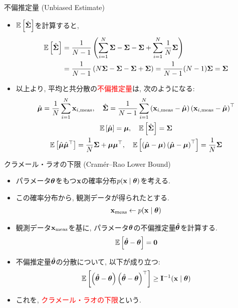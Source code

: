 \documentclass[dvipdfmx,notheorems,t]{beamer}
\begin{document}
\begin{frame}{不偏推定量 (Unbiased Estimate)}
\begin{itemize}
  \item $\operatorname{\mathbb{E}} \left[ \hat{\vb*{\Sigma}} \right]$を計算すると,
  \begin{align*}
    \operatorname{\mathbb{E}} \left[ \hat{\vb*{\Sigma}} \right] &= \frac{1}{N - 1} \left(
      \sum_{i = 1}^N \vb{\Sigma} - \vb{\Sigma} - \vb{\Sigma} + \sum_{i = 1}^N \frac{1}{N} \vb{\Sigma} \right) \\
    &= \frac{1}{N - 1} \left( N \vb{\Sigma} - \vb{\Sigma} - \vb{\Sigma} + \vb{\Sigma} \right)
    = \frac{1}{N - 1} (N - 1) \vb{\Sigma} = \vb{\Sigma}
  \end{align*}
  \item 以上より, 平均と共分散の\textcolor{red}{不偏推定量}は, 次のようになる:
  \begin{gather*}
    \hat{\vb*{\mu}} = \frac{1}{N} \sum_{i = 1}^N \vb{x}_{i, \mathrm{meas}}, \quad
    \hat{\vb{\Sigma}} = \frac{1}{N - 1} \sum_{i = 1}^N
      \left( \vb{x}_{i, \mathrm{meas}} - \hat{\vb*{\mu}} \right)
      \left( \vb{x}_{i, \mathrm{meas}} - \hat{\vb*{\mu}} \right)^\top \\
    \operatorname{\mathbb{E}} \left[ \hat{\vb*{\mu}} \right] = \vb*{\mu}, \quad
    \operatorname{\mathbb{E}} \left[ \hat{\vb{\Sigma}} \right] = \vb{\Sigma} \\
    \operatorname{\mathbb{E}} \left[ \hat{\vb*{\mu}} \hat{\vb*{\mu}}^\top \right] = \frac{1}{N} \vb{\Sigma} + \vb*{\mu} \vb*{\mu}^\top, \quad
    \operatorname{\mathbb{E}} \left[ \left( \hat{\vb*{\mu}} - \vb*{\mu} \right)
      \left( \hat{\vb*{\mu}} - \vb*{\mu} \right)^\top \right] = \frac{1}{N} \vb{\Sigma}
  \end{gather*}
\end{itemize}
\end{frame}

\begin{frame}{クラメール・ラオの下限 (Cramér--Rao Lower Bound)}
\begin{itemize}
  \item パラメータ$\vb*{\theta}$をもつ$\vb{x}$の確率分布$p(\vb{x} \mid \vb*{\theta})$を考える.
  \item この確率分布から, 観測データが得られたとする.
  \begin{align*}
    \vb{x}_\mathrm{meas} \gets p(\vb{x} \mid \vb*{\theta})
  \end{align*}
  \item 観測データ$\vb{x}_\mathrm{meas}$を基に,
  パラメータ$\vb*{\theta}$の不偏推定量$\hat{\vb*{\theta}}$を計算する.
  \begin{align*}
    \operatorname{\mathbb{E}} \left[ \hat{\vb*{\theta}} - \vb*{\theta} \right] = \vb{0}
  \end{align*}
  \item 不偏推定量$\hat{\vb*{\theta}}$の分散について, 以下が成り立つ:
  \begin{align*}
    \operatorname{\mathbb{E}} \left[ \left( \hat{\vb*{\theta}} - \vb*{\theta} \right)
      \left( \hat{\vb*{\theta}} - \vb*{\theta} \right)^\top \right] \ge \vb{I}^{-1}(\vb{x} \mid \vb*{\theta})
  \end{align*}
  \item これを, \textcolor{red}{クラメール・ラオの下限}という.
\end{itemize}
\end{frame}
\end{document}

